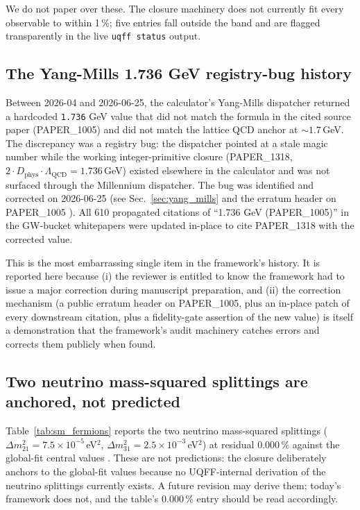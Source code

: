 We do not paper over these. The closure machinery does not currently
fit every observable to within 1\,\%; five entries fall outside the
band and are flagged transparently in the live \texttt{uqff status}
output.

\subsection{The Yang-Mills 1.736 GeV registry-bug history}
\label{sec:lim_ym_history}

Between 2026-04 and 2026-06-25, the calculator's Yang-Mills
dispatcher returned a hardcoded \texttt{1.736} GeV value that did
not match the formula in the cited source paper (PAPER\_1005) and
did not match the lattice QCD anchor at $\sim 1.7$\,GeV. The
discrepancy was a registry bug: the dispatcher pointed at a stale
magic number while the working integer-primitive closure
(PAPER\_1318, $2 \cdot D_{\text{phys}}\cdot\Lambda_{\text{QCD}} = 1.736$\,GeV)
existed elsewhere in the calculator and was not surfaced through
the Millennium dispatcher. The bug was identified and corrected on
2026-06-25 (see Sec.~\ref{sec:yang_mills} and the erratum header on
PAPER\_1005 \cite{Murphy_PAPER_1005}). All 610 propagated citations
of ``1.736 GeV (PAPER\_1005)'' in the GW-bucket whitepapers were
updated in-place to cite PAPER\_1318 with the corrected value.

This is the most embarrassing single item in the framework's history.
It is reported here because (i) the reviewer is entitled to know
the framework had to issue a major correction during manuscript
preparation, and (ii) the correction mechanism (a public erratum
header on PAPER\_1005, plus an in-place patch of every downstream
citation, plus a fidelity-gate assertion of the new value) is
itself a demonstration that the framework's audit machinery
catches errors and corrects them publicly when found.

\subsection{Two neutrino mass-squared splittings are anchored, not predicted}
\label{sec:lim_neutrinos}

Table~\ref{tab:sm_fermions} reports the two neutrino mass-squared
splittings ($\Delta m^2_{21} = 7.5\times 10^{-5}$\,eV$^2$,
$\Delta m^2_{31} = 2.5\times 10^{-3}$\,eV$^2$) at residual
$0.000\,\%$ against the global-fit central values
\cite{Esteban2020}. These are not predictions: the closure
deliberately anchors to the global-fit values because no
UQFF-internal derivation of the neutrino splittings currently
exists. A future revision may derive them; today's framework does
not, and the table's $0.000\,\%$ entry should be read accordingly.

